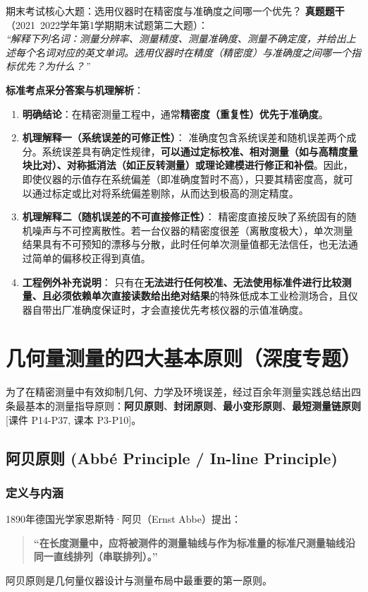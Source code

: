\documentclass[11pt,a4paper]{ctexart}
\begin{document}
\begin{exambox}{期末考试核心大题：选用仪器时在精密度与准确度之间哪一个优先？}
\textbf{真题题干}（2021~2022学年第1学期期末试题第二大题）：\\
\emph{“解释下列名词：测量分辨率、测量精度、测量准确度、测量不确定度，并给出上述每个名词对应的英文单词。选用仪器时在精度（精密度）与准确度之间哪一个指标优先？为什么？”}

\vspace{6pt}
\textbf{标准考点采分答案与机理解析}：
\begin{enumerate}[leftmargin=1.5em, itemsep=3pt]
    \item \textbf{明确结论}：在精密测量工程中，通常\textbf{精密度（重复性）优先于准确度}。
    \item \textbf{机理解释一（系统误差的可修正性）}：
    准确度包含系统误差和随机误差两个成分。系统误差具有确定性规律，\textbf{可以通过定标校准、相对测量（如与高精度量块比对）、对称抵消法（如正反转测量）或理论建模进行修正和补偿}。因此，即使仪器的示值存在系统偏差（即准确度暂时不高），只要其精密度高，就可以通过标定或比对将系统偏差剔除，从而达到极高的测定精度。
    \item \textbf{机理解释二（随机误差的不可直接修正性）}：
    精密度直接反映了系统固有的随机噪声与不可控离散性。若一台仪器的精密度很差（离散度极大），单次测量结果具有不可预知的漂移与分散，此时任何单次测量值都无法信任，也无法通过简单的偏移校正得到真值。
    \item \textbf{工程例外补充说明}：
    只有在\textbf{无法进行任何校准、无法使用标准件进行比较测量、且必须依赖单次直接读数给出绝对结果}的特殊低成本工业检测场合，且仪器自带出厂准确度保证时，才会直接优先考核仪器的示值准确度。
\end{enumerate}
\end{exambox}

\newpage
\section{几何量测量的四大基本原则（深度专题）}

为了在精密测量中有效抑制几何、力学及环境误差，经过百余年测量实践总结出四条最基本的测量指导原则：\textbf{阿贝原则}、\textbf{封闭原则}、\textbf{最小变形原则}、\textbf{最短测量链原则} \hfill\textsf{[课件 P14-P37, 课本 P3-P10]}。

\subsection{阿贝原则 (Abbé Principle / In-line Principle)}
\subsubsection{定义与内涵}
1890年德国光学家恩斯特·阿贝（Ernst Abbe）提出：
\begin{quote}
\textbf{“在长度测量中，应将被测件的测量轴线与作为标准量的标准尺测量轴线沿同一直线排列（串联排列）。”}
\end{quote}
阿贝原则是几何量仪器设计与测量布局中最重要的第一原则。
\end{document}
